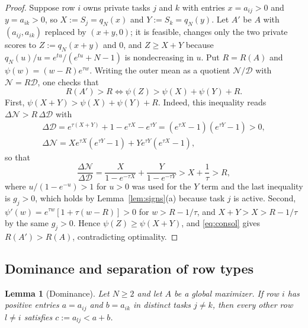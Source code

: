 \documentclass[11pt]{article}
\theoremstyle{plain}
\newtheorem{lemma}[theorem]{Lemma}
\theoremstyle{definition}
\theoremstyle{remark}
\begin{document}
\begin{proof}
Suppose row $i$ owns private tasks $j$ and $k$ with entries $x=a_{ij}>0$ and $y=a_{ik}>0$, so $X:=S_j=q_N(x)$ and $Y:=S_k=q_N(y)$. Let $A'$ be $A$ with $(a_{ij},a_{ik})$ replaced by $(x+y,0)$; it is feasible, changes only the two private scores to $Z:=q_N(x+y)$ and $0$, and $Z\ge X+Y$ because $q_N(u)/u=e^{tu}/(e^{tu}+N-1)$ is nondecreasing in $u$. Put $R=R(A)$ and $\psi(w)=(w-R)e^{\tau w}$. Writing the outer mean as a quotient $\mathcal N/\mathcal D$ with $\mathcal N=R\mathcal D$, one checks that
\begin{equation}\label{eq:consol}
 R(A')>R\iff \psi(Z)>\psi(X)+\psi(Y)+R .
\end{equation}
First, $\psi(X+Y)>\psi(X)+\psi(Y)+R$. Indeed, this inequality reads $\Delta\mathcal N>R\,\Delta\mathcal D$ with
\begin{gather*}
 \Delta\mathcal D=e^{\tau(X+Y)}+1-e^{\tau X}-e^{\tau Y}=(e^{\tau X}-1)(e^{\tau Y}-1)>0,\\
 \Delta\mathcal N=Xe^{\tau X}(e^{\tau Y}-1)+Ye^{\tau Y}(e^{\tau X}-1),
\end{gather*}
so that
\[
 \frac{\Delta\mathcal N}{\Delta\mathcal D}=\frac{X}{1-e^{-\tau X}}+\frac{Y}{1-e^{-\tau Y}}>X+\frac1\tau>R,
\]
where $u/(1-e^{-u})>1$ for $u>0$ was used for the $Y$ term and the last inequality is $g_j>0$, which holds by Lemma~\ref{lem:signs}(a) because task $j$ is active. Second, $\psi'(w)=e^{\tau w}[1+\tau(w-R)]>0$ for $w>R-1/\tau$, and $X+Y>X>R-1/\tau$ by the same $g_j>0$. Hence $\psi(Z)\ge\psi(X+Y)$, and \eqref{eq:consol} gives $R(A')>R(A)$, contradicting optimality.
\end{proof}

\subsection{Dominance and separation of row types}

\begin{lemma}[Dominance]\label{lem:dominance}
Let $N\ge2$ and let $A$ be a global maximizer. If row $i$ has positive entries $a=a_{ij}$ and $b=a_{ik}$ in distinct tasks $j\ne k$, then every other row $l\ne i$ satisfies $c:=a_{lj}<a+b$.
\end{lemma}
\end{document}
